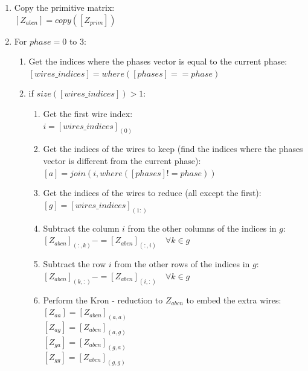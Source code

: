 \documentclass[nols,a4paper,twoside,notoc,fleqn]{tufte-book}
\begin{document}
\begin{enumerate}
	\item Copy the primitive matrix: \\
	$\left[Z_{abcn}\right] = copy(\left[Z_{prim}\right])$
	
	\item For $phase=0$ to $3$:
		
	\begin{enumerate}
		
		\item Get the indices where the phases vector is equal to the current phase:\\ 
		$\left[wires\_indices\right] = where(\left[phases\right] == phase)$
		
		\item if $size(\left[wires\_indices\right]) > 1$:
		
		\begin{enumerate}

			\item Get the first wire index: \\
			$i = \left[wires\_indices\right]_{(0)}$
			
			\item  Get the indices of the wires to keep (find the indices where the phases vector is different from the current phase): \\
			$\left[a\right] = join(i, where(\left[phases\right] != phase))$
			
			\item Get the indices of the wires to reduce (all except the first): \\
			$\left[g\right] = \left[wires\_indices\right]_{(1:)}$
			
			\item Subtract the column $i$ from the other columns of the indices in $g$:\\
			$\left[Z_{abcn}\right]_{(:, k)} -= \left[Z_{abcn}\right]_{ (:, i)} \quad \forall k \in g$
			
			\item Subtract the row $i$ from the other rows of the indices in $g$:\\
			$\left[Z_{abcn}\right]_{(k, :)} -= \left[Z_{abcn}\right]_{ (i, :)} \quad \forall k \in g$
			
			\item Perform the Kron - reduction to $Z_{abcn}$ to embed the extra wires:\\
			$\left[Z_{aa}\right] = \left[Z_{abcn}\right]_{(a, a)}$ \\
			$\left[Z_{ag}\right] = \left[Z_{abcn}\right]_{(a, g)}$ \\
			$\left[Z_{ga}\right] = \left[Z_{abcn}\right]_{(g, a)}$ \\
			$\left[Z_{gg}\right] = \left[Z_{abcn}\right]_{(g, g)}$ \\
			

\end{enumerate}
\end{enumerate}
\end{enumerate}
\end{document}
